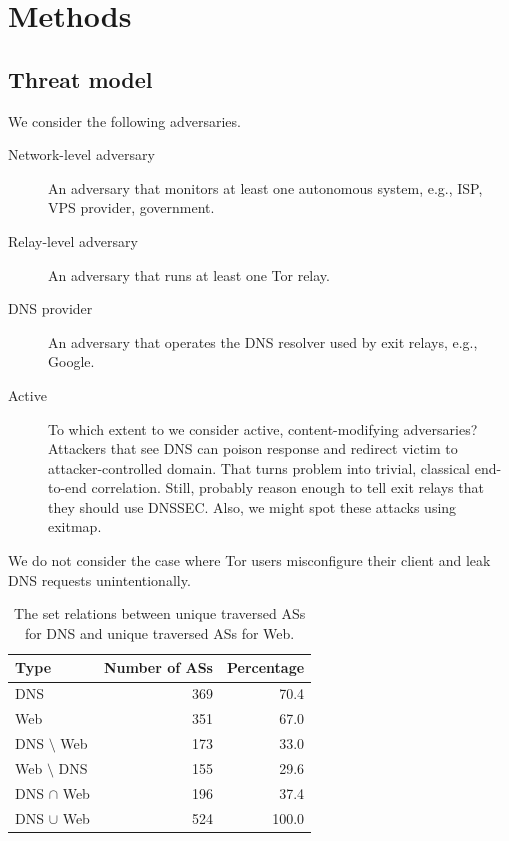 \section{Methods}
\label{sec:methods}

\subsection{Threat model}
We consider the following adversaries.
\begin{description}
	\item[Network-level adversary] An adversary that monitors at least
		one autonomous system, e.g., ISP, VPS provider, government.
	\item[Relay-level adversary] An adversary that runs at least one Tor relay.
	\item[DNS provider] An adversary that operates the DNS resolver used
		by exit relays, e.g., Google.
	\item[Active] To which extent to we consider active, content-modifying
		adversaries?  Attackers that see DNS can poison response and redirect
		victim to attacker-controlled domain.  That turns problem into trivial,
		classical end-to-end correlation.  Still, probably reason enough to tell
		exit relays that they should use DNSSEC.  Also, we might spot these
		attacks using exitmap.
\end{description}

We do not consider the case where Tor users misconfigure their client and leak
DNS requests unintentionally.

\begin{table}[t]
	\centering
	\begin{tabular}{l r r}
	\toprule
	\textbf{Type} & \textbf{Number of ASs} & \textbf{Percentage} \\
	\midrule
	DNS & 369 & 70.4 \\
	Web & 351 & 67.0 \\
	DNS $\setminus$ Web & 173 & 33.0 \\
	Web $\setminus$ DNS & 155 & 29.6 \\
	DNS $\cap$ Web & 196 & 37.4 \\
	DNS $\cup$ Web & 524 & 100.0 \\
	\bottomrule
	\end{tabular}
	\caption{The set relations between unique traversed ASs for DNS and unique
	traversed ASs for Web.}
	\label{tab:traversed-ass}
\end{table}

